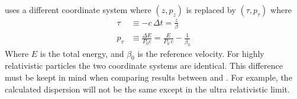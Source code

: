 \mad uses a different coordinate system where $(z, p_z)$ is replaced by $(\tau, p_\tau)$ where
\begin{align}
  \tau & \equiv -c \, \Delta t = \frac{z}{\beta} \\
  p_\tau &\equiv \frac{\Delta E}{P_0 c} = \frac{E}{P_0 \, c} - \frac{1}{\beta_0} 
\end{align}
Where $E$ is the total energy, and $\beta_0$ is the reference velocity. For highly relativistic
particles the two coordinate systems are identical.  This difference must be keept in mind when
comparing results between \bmad and \mad. For example, the calculated dispersion will not be the
same except in the ultra relativistic limit.
